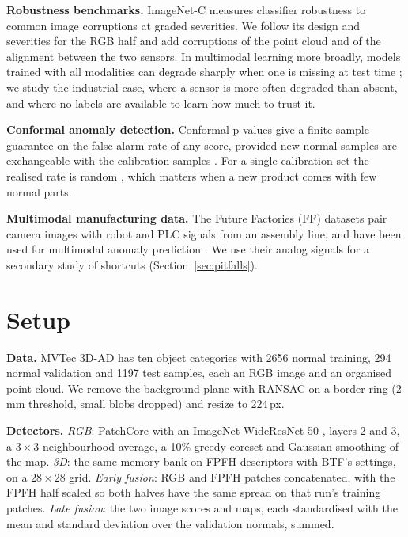 \documentclass[10pt,twocolumn,letterpaper]{article}
\begin{document}
\textbf{Robustness benchmarks.} ImageNet-C \citep{hendrycks2019imagenetc} measures classifier robustness to common image corruptions at graded severities. We follow its design and severities for the RGB half and add corruptions of the point cloud and of the alignment between the two sensors. In multimodal learning more broadly, models trained with all modalities can degrade sharply when one is missing at test time \citep{ma2022missing}; we study the industrial case, where a sensor is more often degraded than absent, and where no labels are available to learn how much to trust it.

\textbf{Conformal anomaly detection.} Conformal p-values give a finite-sample guarantee on the false alarm rate of any score, provided new normal samples are exchangeable with the calibration samples \citep{vovk2005alrw,bates2023outliers}. For a single calibration set the realised rate is random \citep{vovk2012conditional}, which matters when a new product comes with few normal parts.

\textbf{Multimodal manufacturing data.} The Future Factories (FF) datasets \citep{harik2024ff,harik2025ffv2} pair camera images with robot and PLC signals from an assembly line, and have been used for multimodal anomaly prediction \citep{prasad2024assemai,shyalika2025nsfmap}. We use their analog signals for a secondary study of shortcuts (Section~\ref{sec:pitfalls}).

\section{Setup}
\label{sec:setup}

\textbf{Data.} MVTec 3D-AD has ten object categories with 2656 normal training, 294 normal validation and 1197 test samples, each an RGB image and an organised point cloud. We remove the background plane with RANSAC on a border ring (2\,mm threshold, small blobs dropped) and resize to 224\,px.

\textbf{Detectors.} \emph{RGB}: PatchCore with an ImageNet WideResNet-50 \citep{zagoruyko2016wrn}, layers 2 and 3, a $3{\times}3$ neighbourhood average, a 10\% greedy coreset and Gaussian smoothing of the map. \emph{3D}: the same memory bank on FPFH descriptors with BTF's settings, on a $28{\times}28$ grid. \emph{Early fusion}: RGB and FPFH patches concatenated, with the FPFH half scaled so both halves have the same spread on that run's training patches. \emph{Late fusion}: the two image scores and maps, each standardised with the mean and standard deviation over the validation normals, summed.
\end{document}
